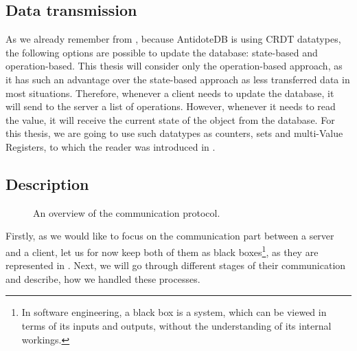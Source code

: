 
\subsection{Data transmission}

As we already remember from , because AntidoteDB is using CRDT datatypes, the following options are possible to update the database: state-based and operation-based. This thesis will consider only the operation-based approach, as it has such an advantage over the state-based approach as less transferred data in most situations. Therefore, whenever a client needs to update the database, it will send to the server a list of operations. However, whenever it needs to read the value, it will receive the current state of the object from the database. For this thesis, we are going to use such datatypes as counters, sets and multi-Value Registers, to which the reader was introduced in .

\subsection{Description} 

\begin{figure}[!htb]
    \begin{center}
    \def\svgwidth{0.6\linewidth}
    
    \caption {An overview of the communication protocol.}
    \label{fig:protocol1}
\end{center}
\end{figure}

Firstly, as we would like to focus on the communication part between a server and a client, let us for now keep both of them as black boxes\footnote{In software engineering, a black box is a system, which can be viewed in terms of its inputs and outputs, without the understanding of its internal workings.\cite{49}}, as they are represented in . Next, we will go through different stages of their communication and describe, how we handled these processes. 

